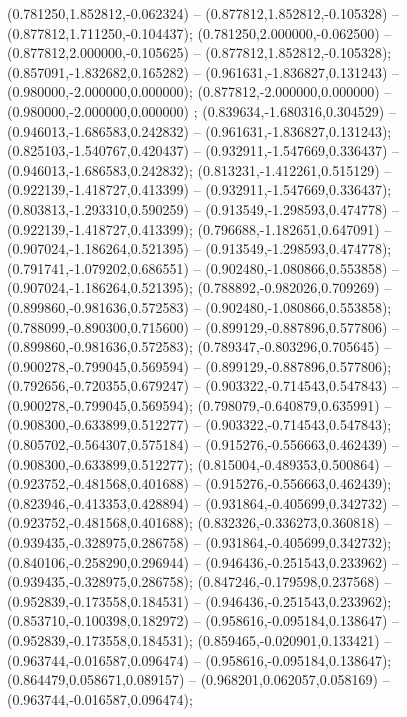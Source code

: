  (0.781250,1.852812,-0.062324) -- (0.877812,1.852812,-0.105328) -- (0.877812,1.711250,-0.104437);
 (0.781250,2.000000,-0.062500) -- (0.877812,2.000000,-0.105625) -- (0.877812,1.852812,-0.105328);
 (0.857091,-1.832682,0.165282) -- (0.961631,-1.836827,0.131243) -- (0.980000,-2.000000,0.000000);
 (0.877812,-2.000000,0.000000) -- (0.980000,-2.000000,0.000000) ;
 (0.839634,-1.680316,0.304529) -- (0.946013,-1.686583,0.242832) -- (0.961631,-1.836827,0.131243);
 (0.825103,-1.540767,0.420437) -- (0.932911,-1.547669,0.336437) -- (0.946013,-1.686583,0.242832);
 (0.813231,-1.412261,0.515129) -- (0.922139,-1.418727,0.413399) -- (0.932911,-1.547669,0.336437);
 (0.803813,-1.293310,0.590259) -- (0.913549,-1.298593,0.474778) -- (0.922139,-1.418727,0.413399);
 (0.796688,-1.182651,0.647091) -- (0.907024,-1.186264,0.521395) -- (0.913549,-1.298593,0.474778);
 (0.791741,-1.079202,0.686551) -- (0.902480,-1.080866,0.553858) -- (0.907024,-1.186264,0.521395);
 (0.788892,-0.982026,0.709269) -- (0.899860,-0.981636,0.572583) -- (0.902480,-1.080866,0.553858);
 (0.788099,-0.890300,0.715600) -- (0.899129,-0.887896,0.577806) -- (0.899860,-0.981636,0.572583);
 (0.789347,-0.803296,0.705645) -- (0.900278,-0.799045,0.569594) -- (0.899129,-0.887896,0.577806);
 (0.792656,-0.720355,0.679247) -- (0.903322,-0.714543,0.547843) -- (0.900278,-0.799045,0.569594);
 (0.798079,-0.640879,0.635991) -- (0.908300,-0.633899,0.512277) -- (0.903322,-0.714543,0.547843);
 (0.805702,-0.564307,0.575184) -- (0.915276,-0.556663,0.462439) -- (0.908300,-0.633899,0.512277);
 (0.815004,-0.489353,0.500864) -- (0.923752,-0.481568,0.401688) -- (0.915276,-0.556663,0.462439);
 (0.823946,-0.413353,0.428894) -- (0.931864,-0.405699,0.342732) -- (0.923752,-0.481568,0.401688);
 (0.832326,-0.336273,0.360818) -- (0.939435,-0.328975,0.286758) -- (0.931864,-0.405699,0.342732);
 (0.840106,-0.258290,0.296944) -- (0.946436,-0.251543,0.233962) -- (0.939435,-0.328975,0.286758);
 (0.847246,-0.179598,0.237568) -- (0.952839,-0.173558,0.184531) -- (0.946436,-0.251543,0.233962);
 (0.853710,-0.100398,0.182972) -- (0.958616,-0.095184,0.138647) -- (0.952839,-0.173558,0.184531);
 (0.859465,-0.020901,0.133421) -- (0.963744,-0.016587,0.096474) -- (0.958616,-0.095184,0.138647);
 (0.864479,0.058671,0.089157) -- (0.968201,0.062057,0.058169) -- (0.963744,-0.016587,0.096474);
